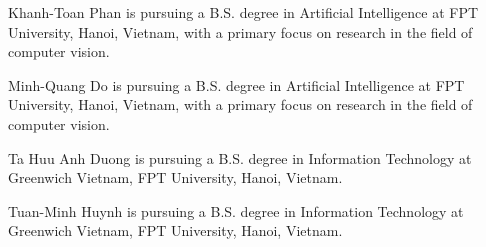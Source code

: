 \documentclass{ieeeaccess}
\begin{document}
\begin{IEEEbiography}{Khanh-Toan Phan} is pursuing a B.S. degree in Artificial Intelligence at FPT University, Hanoi, Vietnam, with a primary focus on research in the field of computer vision.
\end{IEEEbiography}

\begin{IEEEbiography}{Minh-Quang Do} is pursuing a B.S. degree in Artificial Intelligence at FPT University, Hanoi, Vietnam, with a primary focus on research in the field of computer vision.
\end{IEEEbiography}

\begin{IEEEbiography}{Ta Huu Anh Duong} is pursuing a B.S. degree in Information Technology at Greenwich Vietnam, FPT University, Hanoi, Vietnam.
\end{IEEEbiography}

\begin{IEEEbiography}{Tuan-Minh Huynh} is pursuing a B.S. degree in Information Technology at Greenwich Vietnam, FPT University, Hanoi, Vietnam.
\end{IEEEbiography}
\end{document}
